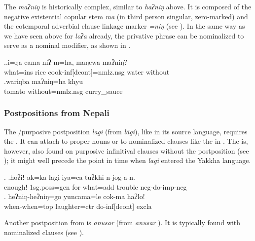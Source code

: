 The \emph{maʔniŋ} is historically complex, similar to \emph{haʔniŋ} above. It is composed of the negative existential copular stem \emph{ma} (in third person singular, zero-marked) and  the cotemporal adverbial clause linkage marker \emph{=niŋ} (see \Next). In the same way as we have seen above for \emph{loʔa} already, the privative phrase can be nominalized to serve as a nominal modifier, as shown in \Next[b].
  
  \ex.\ag.i=ŋa      cama        niʔ-m=ha,     maŋcwa maʔniŋ?\\
  what{\sc =ins} rice cook{\sc -inf[deont]=nmlz.nsg} water without\\
 
\bg.wariŋba maʔniŋ=ha khyu\\
tomato without{\sc =nmlz.nsg} curry\_sauce\\
  
  
\subsubsection{Postpositions from Nepali}
  
The /purposive postposition \emph{lagi} (from   \emph{lāgi}), like in its source language, requires the  . It can attach to proper nouns  or to nominalized clauses like the  in \Next[b]. The  is, however, also found on purposive infinitival clauses without the postposition (see ); it might well precede the point in time when \emph{lagi} entered the Yakkha language.

\ex. \ag.hoʔiǃ  ak=ka          lagi  iya=ca                       tuʔkhi n-jog-a-n.\\
enough! {\sc 1sg.poss=gen} for what{\sc =add} trouble {\sc neg-}do{\sc -imp-neg}\\
 \bg.  heʔniŋ-heʔniŋ=go    yuncama=le           cok-ma       haʔlo!\\
when-when{\sc =top} laughter{\sc =ctr} do{\sc -inf[deont]} {\sc excla}\\

Another postposition from  is \emph{anusar}  (from  \emph{anusār} ). It is typically found with nominalized clauses (see \Next).


